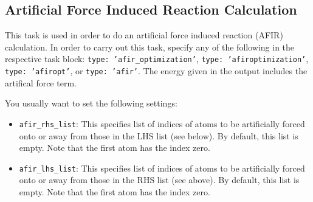 \documentclass[]{tufte-book}
\begin{document}
\subsection{Artificial Force Induced Reaction Calculation}

This task is used in order to do an artificial force induced reaction (AFIR\cite{afir1, afir2}) calculation. In 
order to carry out this task, specify any of the following in the respective task block: \texttt{type: 'afir\_optimization'}, 
\texttt{type: 'afiroptimization'}, \texttt{type: 'afiropt'}, or \texttt{type: 'afir'}. The energy given in the output
includes the artifical force term.

You usually want to set the following settings:
\begin{itemize}
\item \texttt{afir\_rhs\_list}: This specifies list of indices of atoms to be artificially forced onto or away from those 
in the LHS list (see below). By default, this list is empty. Note that the first atom has the index zero.
\item \texttt{afir\_lhs\_list}: This specifies list of indices of atoms to be artificially forced onto or away from those 
in the RHS list (see above). By default, this list is empty. Note that the first atom has the index zero.
\end{itemize}
\end{document}
